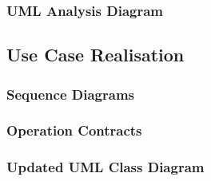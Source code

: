 \subsubsection{UML Analysis Diagram}

\subsection{Use Case Realisation}

\subsubsection{Sequence Diagrams}

\subsubsection{Operation Contracts}

\subsubsection{Updated UML Class Diagram}
